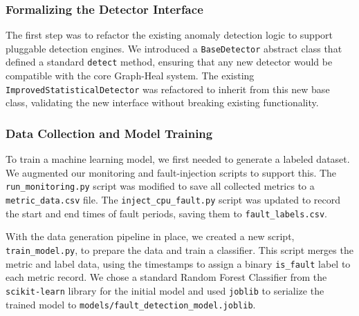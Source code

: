 \documentclass[11pt,conference]{IEEEtran}
\begin{document}
\subsubsection{Formalizing the Detector Interface}
The first step was to refactor the existing anomaly detection logic to support pluggable detection engines. We introduced a \texttt{BaseDetector} abstract class that defined a standard \texttt{detect} method, ensuring that any new detector would be compatible with the core Graph-Heal system. The existing \texttt{ImprovedStatisticalDetector} was refactored to inherit from this new base class, validating the new interface without breaking existing functionality.

\subsubsection{Data Collection and Model Training}
To train a machine learning model, we first needed to generate a labeled dataset. We augmented our monitoring and fault-injection scripts to support this. The \texttt{run\_monitoring.py} script was modified to save all collected metrics to a \texttt{metric\_data.csv} file. The \texttt{inject\_cpu\_fault.py} script was updated to record the start and end times of fault periods, saving them to \texttt{fault\_labels.csv}.

With the data generation pipeline in place, we created a new script, \texttt{train\_model.py}, to prepare the data and train a classifier. This script merges the metric and label data, using the timestamps to assign a binary \texttt{is\_fault} label to each metric record. We chose a standard Random Forest Classifier from the \texttt{scikit-learn} library for the initial model and used \texttt{joblib} to serialize the trained model to \texttt{models/fault\_detection\_model.joblib}.
\end{document}
